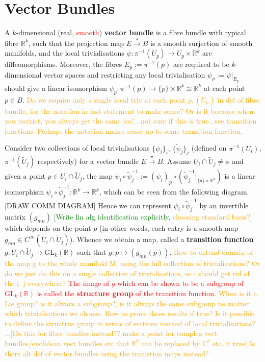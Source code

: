 \documentclass[a4paper]{article}
\theoremstyle{definition} \newtheorem*{definition}{Definition}
\theoremstyle{definition} \newtheorem*{definitions}{Definitions}
\theoremstyle{plain} \newtheorem{theorem}{Theorem}[section]
\theoremstyle{plain} \newtheorem{proposition}[theorem]{Proposition}
\theoremstyle{plain} \newtheorem{corollary}[theorem]{Corollary}
\theoremstyle{plain} \newtheorem{lemma}[theorem]{Lemma}
\theoremstyle{plain} \newtheorem{example}[theorem]{Example}
\newcommand{\checkCorrect}[1]{\textcolor{red}{#1}}
\newcommand{\question}[1]{\textcolor{orange}{#1}}
\newcommand{\finish}[1]{\textcolor{green}{#1}}
\newcommand{\defn}[1]{\textbf{#1}}
\newcommand{\realnos}{\mathbb{R}}
\newcommand{\complexnos}{\mathbb{C}}
\newcommand{\canonicaliso}{\cong}
\begin{document}
\section{Vector Bundles}
A $k$-dimensional (real, \checkCorrect{smooth}) \defn{vector bundle} is a fibre bundle with typical fibre $\realnos^k$, such that the projection map $E\xrightarrow{\pi} B$ is a smooth surjection of smooth manifolds, and the local trivialisations $\psi:\pi^{-1}(U_p) \rightarrow U_p \times \realnos^k$ are diffeomorphisms. Moreover, the fibres $E_p:=\pi^{-1}(p)$ are required to be $k$-dimensional vector spaces and restricting any local trivialisation $\psi_p:=\psi \vert_{E_p}$ should give a linear isomorphism $\psi_p:\pi^{-1}(p)\rightarrow \{p\} \times \realnos^k \canonicaliso \realnos^k$ at each point $p\in B$. \question{Do we require only a single local triv at each point $p, (U_p)$ in def of fibre bundle, for the notation in last statement to make sense? Or is it because when you restrict, you always get the same iso?...not sure if this is true...see transition functions. Perhaps the notation makes sense up to some transition function.}

Consider two collections of local trivialisations $\{\psi_i \}_i$, $\{\tilde{\psi}_j\}_j$ (defined on $\pi^{-1}(U_i)$, $\pi^{-1}(\tilde{U}_j)$ respectively) 
for a vector bundle $E\xrightarrow{\pi} B$. Assume $U_i \cap \tilde{U}_j\neq \phi$ and given a 
point $p\in U_i \cap \tilde{U}_j$, the map $\psi_i \circ \tilde{\psi}_j^{-1}:=(\psi_i)_p \circ (\tilde{\psi}_j^{-1}\vert_{\{p\}\times \realnos^k})$ 
is a linear isomorphism $\psi_i \circ \tilde{\psi}_j^{-1} : \realnos^k \rightarrow \realnos^k$, 
which can be seen from the following diagram.
[DRAW COMM DIAGRAM]
Hence we can represent $\psi_i \circ \tilde{\psi}_j^{-1}$ by an invertible matrix $(g_{mn})$ \finish{[Write lin alg identification explicitly, \question{choosing standard basis?}]} which depends on the point $p$ (in other words, each entry is a smooth map $g_{mn}\in C^\infty(U_i\cap \tilde{U}_j)$). Whence we obtain a map, called a \defn{transition function}
$g:U_i\cap \tilde{U}_j\rightarrow \mathrm{GL}_k(\realnos)$ such that $g:p\mapsto (g_{mn}(p))$. \question{How to extend domain of the map g to the whole manifold M, using the full collection of trivialisations? Or do we just do this on a single collection of trivialisations, so i should get rid of the i, j everywhere?} \checkCorrect{The image of $g$ which can be shown to be a subgroup of $\mathrm{GL}_k(\realnos)$ is called the \defn{structure group} of the transition function.} \question{When is it a Lie group? is it always a subgroup?, is it always the same subgroup no matter which trivialisations we choose. How to prove these results if true?} \question{Is it possible to define the structrue group in terms of sections instead of local trivialisations?}
\question{...[Do this for fibre bundles instead?? make a point for complex vect bundles/euclidean vect bundles etc that $\realnos^k$ can be replaced by $\complexnos^k$ etc. if true]}
\question{Is there alt def of vector bundles using the tranistion maps instead?}
\end{document}

